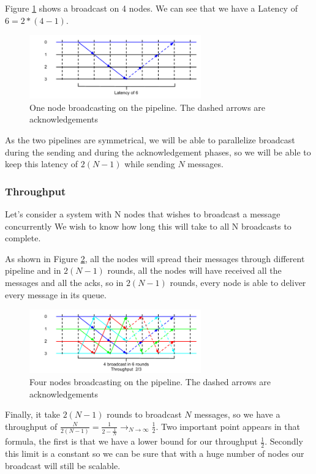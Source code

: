 \documentclass[a4paper]{article}
\begin{document}
Figure \ref{figure:latency2} shows a broadcast on 4 nodes. We can see that
we have a Latency of $6=2*(4-1)$.

\begin{figure}[h]
    \centering
    \includegraphics[width=280px]{Latency2.png}
    \caption{One node broadcasting on the pipeline. The dashed arrows are
    acknowledgements}
    \label{figure:latency2}
\end{figure}

As the two pipelines are symmetrical, we will be able to parallelize broadcast
during the sending and during the acknowledgement phases, so we will be able to
keep this latency of $2(N-1)$ while sending $N$ messages.
\subsubsection{Throughput}
Let’s consider a system with N nodes that wishes to broadcast a message concurrently
We wish to know how long this will take to all N broadcasts to
complete.

As shown in Figure \ref{figure:throughput2}, all the nodes will spread their
messages through different pipeline and in $2(N-1)$ rounds, all the
nodes will have received all the messages and all the acks, so in $2(N-1)$ rounds,
every node is able to deliver every message in its queue.

\begin{figure}[h]
    \centering
    \includegraphics[width=280px]{Throughput2.png}
    \caption{Four nodes broadcasting on the pipeline. The dashed arrows are
    acknowledgements}
    \label{figure:throughput2}
\end{figure}

Finally, it take $2(N-1)$ rounds to broadcast $N$ messages, so we have a throughput
of $\frac{N}{2(N-1)}=\frac{1}{2-\frac{1}{N}}\longrightarrow_{N \rightarrow
\infty}\frac{1}{2}$. Two important point appears in that formula, the first is
that we have a lower bound for our throughput $\frac{1}{2}$. Secondly this limit 
is a constant so we can be sure that with a huge number of nodes our broadcast
will still be scalable.
\end{document}
